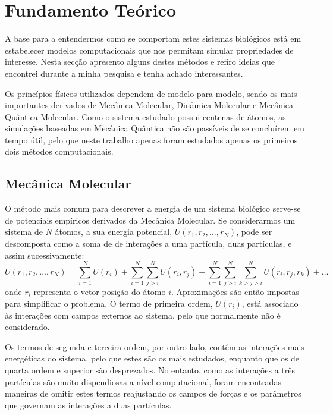 \documentclass[12pt,a4paper]{article}
\begin{document}
\section{Fundamento Teórico}
	A base para a entendermos como se comportam estes sistemas biológicos está em estabelecer modelos computacionais que nos permitam simular propriedades de interesse. Nesta secção apresento alguns destes métodos e refiro ideias que encontrei durante a minha pesquisa e tenha achado interessantes.
	
	Os princípios físicos utilizados dependem de modelo para modelo, sendo os mais importantes derivados de Mecânica Molecular, Dinâmica Molecular e Mecânica Quântica Molecular. Como o sistema estudado possui centenas de átomos, as simulações baseadas em Mecânica Quântica não são passíveis de se concluírem em tempo útil, pelo que neste trabalho apenas foram estudados apenas os primeiros dois métodos computacionais.
	
\subsection{Mecânica Molecular}\label{sec:MM}
	O método mais comum para descrever a energia de um sistema biológico serve-se de potenciais empíricos derivados da Mecânica Molecular.	Se considerarmos um sistema de $N$ átomos, a sua energia potencial, $U\left(r_{1}, r_{2}, \ldots, r_{N}\right)$, pode ser descomposta como a soma de de interações a uma partícula, duas partículas, e assim sucessivamente:
	\begin{equation}
		U\left(r_{1}, r_{2}, \ldots, r_{N}\right) = \sum_{i=1}^{N} U\left(r_{i}\right)+\sum_{i=1}^{N} \sum_{j>i}^{N} U\left(r_{i}, r_{j}\right)+\sum_{i=1}^{N} \sum_{j>i}^{N} \sum_{k>j>i}^{N} U\left(r_{i}, r_{j}, r_{k}\right)+\ldots
		\label{eq:intro:Udecomp}
	\end{equation}
	onde $r_i$ representa o vetor posição do átomo $i$. Aproximações são então impostas para simplificar o problema. O termo de primeira ordem, $U\left(r_{i}\right)$, está associado às interações com campos externos ao sistema, pelo que normalmente não é considerado.
	
	Os termos de segunda e terceira ordem, por outro lado, contêm as interações mais energéticas do sistema, pelo que estes são os mais estudados, enquanto que os de quarta ordem e superior são desprezados. No entanto, como as interações a três partículas são muito dispendiosas a nível computacional, foram encontradas maneiras de omitir estes termos reajustando os campos de forças e os parâmetros que governam as interações a duas partículas.
	
\end{document}
